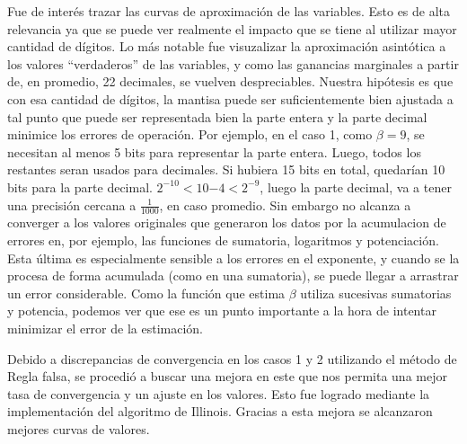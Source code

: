 Fue de inter\'es trazar las curvas de aproximaci\'on de las variables. 
Esto es de alta relevancia ya que se puede ver realmente el impacto que se tiene
al utilizar mayor cantidad de d\'igitos. Lo m\'as notable fue visuzalizar la 
aproximaci\'on asint\'otica a los valores ``verdaderos'' de las variables, 
y como las ganancias marginales a partir de, en promedio, 22 decimales, 
se vuelven despreciables. Nuestra hip\'otesis es que con esa cantidad de 
d\'igitos, la mantisa puede ser suficientemente bien ajustada a tal punto que puede 
ser representada bien la parte entera y la parte decimal minimice los errores de 
operaci\'on. Por ejemplo, en el caso 1, como $\beta = 9$, se necesitan al menos 
5 bits para representar la parte entera. Luego, todos los restantes seran usados 
para decimales. Si hubiera 15 bits en total, quedar\'ian 10 bits para la parte 
decimal. $2^{-10}<10{-4}<2^{-9}$, luego la parte decimal, va a tener una
precisi\'on cercana a $\frac{1}{1000}$, en caso promedio. 
Sin embargo no alcanza a converger a los valores originales que generaron los 
datos por la acumulacion de errores en, por ejemplo, las funciones
de sumatoria, logaritmos y potenciaci\'on. Esta \'ultima es especialmente 
sensible a los errores en el exponente, y cuando se la procesa de forma 
acumulada (como en una sumatoria), se puede llegar a arrastrar un error
considerable. Como la funci\'on que estima
$\beta$ utiliza sucesivas sumatorias y potencia, podemos ver que ese es un punto 
importante a la hora de intentar minimizar el error de la estimaci\'on.

Debido a discrepancias de convergencia en los casos 1 y 2 utilizando el m\'etodo
de Regla falsa, se procedi\'o a buscar una mejora en este que nos permita una mejor
tasa de convergencia y un ajuste en los valores. Esto fue logrado mediante la
implementaci\'on del algoritmo de Illinois. Gracias a esta mejora se alcanzaron 
mejores curvas de valores.
